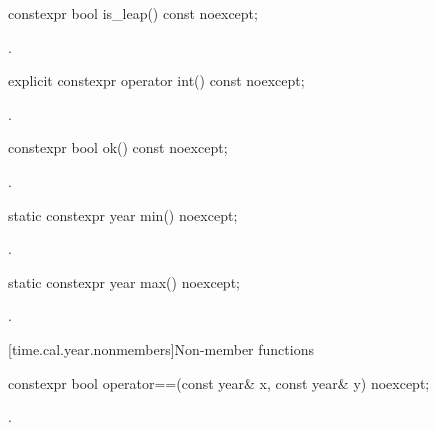 %
\begin{itemdecl}
constexpr bool is_leap() const noexcept;
\end{itemdecl}

\begin{itemdescr}
\pnum
\returns {}.
\end{itemdescr}

%
\begin{itemdecl}
explicit constexpr operator int() const noexcept;
\end{itemdecl}

\begin{itemdescr}
\pnum
\returns {}.
\end{itemdescr}

%
\begin{itemdecl}
constexpr bool ok() const noexcept;
\end{itemdecl}

\begin{itemdescr}
\pnum
\returns {}.
\end{itemdescr}

%
\begin{itemdecl}
static constexpr year min() noexcept;
\end{itemdecl}

\begin{itemdescr}
\pnum
\returns {}.
\end{itemdescr}

%
\begin{itemdecl}
static constexpr year max() noexcept;
\end{itemdecl}

\begin{itemdescr}
\pnum
\returns {}.
\end{itemdescr}

[time.cal.year.nonmembers]{Non-member functions}

%
\begin{itemdecl}
constexpr bool operator==(const year& x, const year& y) noexcept;
\end{itemdecl}

\begin{itemdescr}
\pnum
\returns {}.
\end{itemdescr}

